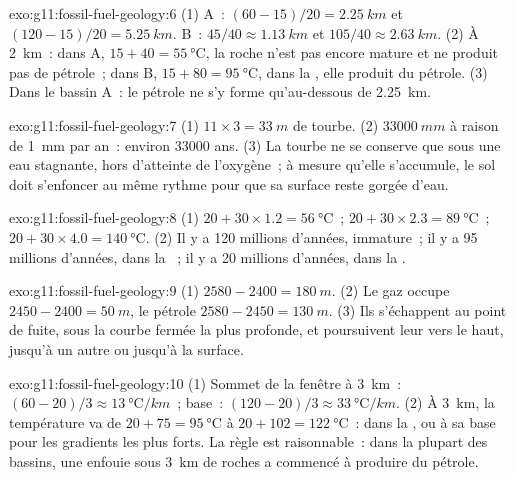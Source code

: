 \begin{solution}{exo:g11:fossil-fuel-geology:6}
(1) A~: $(60 - 15)/20 = \qty{2.25}{km}$ et $(120 - 15)/20 = \qty{5.25}{km}$.
B~: $45/40 \approx \qty{1.13}{km}$ et $105/40 \approx \qty{2.63}{km}$.
(2) À \qty{2}{km}~: dans A, $15 + 40 = \qty{55}{\degreeCelsius}$, la roche
n'est pas encore mature et ne produit pas de pétrole~; dans B,
$15 + 80 = \qty{95}{\degreeCelsius}$, dans la , elle produit
du pétrole. (3) Dans le bassin A~: le pétrole ne s'y forme qu'au-dessous de
\qty{2.25}{km}.
\end{solution}

\begin{solution}{exo:g11:fossil-fuel-geology:7}
(1) $11 \times 3 = \qty{33}{m}$ de tourbe. (2) $\qty{33000}{mm}$ à raison
de \qty{1}{mm} par an~: environ \num{33000} ans. (3) La tourbe ne se
conserve que sous une eau stagnante, hors d'atteinte de l'oxygène~; à
mesure qu'elle s'accumule, le sol doit s'enfoncer au même rythme pour que
sa surface reste gorgée d'eau.
\end{solution}

\begin{solution}{exo:g11:fossil-fuel-geology:8}
(1) $20 + 30 \times 1.2 = \qty{56}{\degreeCelsius}$~;
$20 + 30 \times 2.3 = \qty{89}{\degreeCelsius}$~;
$20 + 30 \times 4.0 = \qty{140}{\degreeCelsius}$.
(2) Il y a 120 millions d'années, immature~; il y a 95 millions d'années,
dans la ~; il y a 20 millions d'années, dans la .
\end{solution}

\begin{solution}{exo:g11:fossil-fuel-geology:9}
(1) $2580 - 2400 = \qty{180}{m}$. (2) Le gaz occupe
$2450 - 2400 = \qty{50}{m}$, le pétrole $2580 - 2450 = \qty{130}{m}$.
(3) Ils s'échappent au point de fuite, sous la courbe fermée la plus
profonde, et poursuivent leur  vers le haut, jusqu'à un autre
 ou jusqu'à la surface.
\end{solution}

\begin{solution}{exo:g11:fossil-fuel-geology:10}
(1) Sommet de la fenêtre à \qty{3}{km}~: $(60 - 20)/3 \approx
\qty{13}{\degreeCelsius/km}$~; base~: $(120 - 20)/3 \approx
\qty{33}{\degreeCelsius/km}$. (2) À \qty{3}{km}, la température va de
$20 + 75 = \qty{95}{\degreeCelsius}$ à $20 + 102 = \qty{122}{\degreeCelsius}$~:
dans la , ou à sa base pour les gradients les plus forts.
La règle est raisonnable~: dans la plupart des bassins, une 
enfouie sous \qty{3}{km} de roches a commencé à produire du pétrole.
\end{solution}

